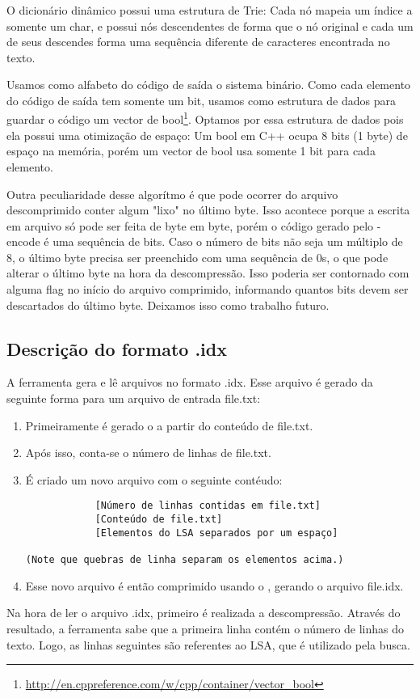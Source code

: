\subsubsection{\lz}
O dicionário dinâmico possui uma estrutura de Trie: Cada nó mapeia um índice a
somente um char, e possui nós descendentes de forma que o nó original e cada um
de seus descendes forma uma sequência diferente de caracteres encontrada no
texto.

Usamos como alfabeto do código de saída o sistema binário. Como cada elemento do
código de saída tem somente um bit, usamos como estrutura de dados para guardar
o código um vector de
bool\footnote{\url{http://en.cppreference.com/w/cpp/container/vector_bool}}.
Optamos por essa estrutura de dados pois ela possui uma otimização de espaço:
Um bool em C++ ocupa 8 bits (1 byte) de espaço na memória, porém um vector de
bool usa somente 1 bit para cada elemento.

Outra peculiaridade desse algorítmo é que pode ocorrer do arquivo descomprimido
conter algum "lixo" no último byte. Isso acontece porque a escrita em arquivo só
pode ser feita de byte em byte, porém o código gerado pelo \lz-encode é uma
sequência de bits. Caso o número de bits não seja um múltiplo de 8, o último
byte precisa ser preenchido com uma sequência de 0s, o que pode alterar o último
byte na hora da descompressão. Isso poderia ser contornado com alguma flag no
início do arquivo comprimido, informando quantos bits devem ser descartados do
último byte. Deixamos isso como trabalho futuro.

\subsection{Descrição do formato .idx}

A ferramenta \ipmt gera e lê arquivos no formato .idx. Esse arquivo é gerado da
seguinte forma para um arquivo de entrada file.txt:

\begin{enumerate}

\item Primeiramente é gerado o \lsa a partir do conteúdo de file.txt.
\item Após isso, conta-se o número de linhas de file.txt.
\item É criado um novo arquivo com o seguinte contéudo:
\begin{verbatim}
            [Número de linhas contidas em file.txt]
            [Conteúdo de file.txt]
            [Elementos do LSA separados por um espaço]

(Note que quebras de linha separam os elementos acima.)
\end{verbatim}
\item Esse novo arquivo é então comprimido usando o \lz, gerando o arquivo file.idx.

\end{enumerate}

Na hora de ler o arquivo .idx, primeiro é realizada a descompressão. Através do
resultado, a ferramenta sabe que a primeira linha contém o número de linhas do
texto. Logo, as linhas seguintes são referentes ao LSA, que é utilizado pela
busca.

